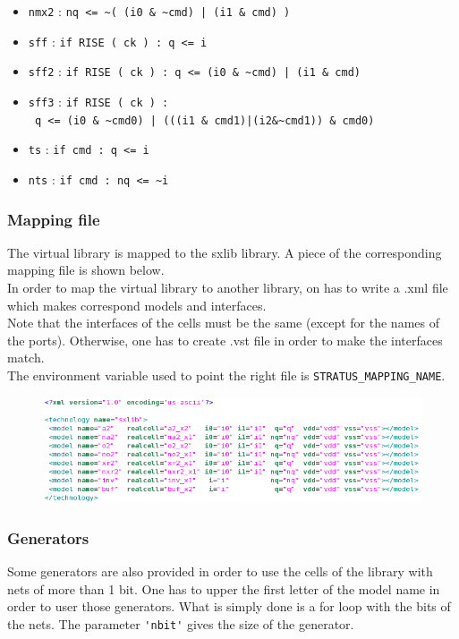 \begin{itemize}
    \item \verb-nmx2- : \verb-nq <= ~( (i0 & ~cmd) | (i1 & cmd) )-
    \item \verb-sff- : \verb-if RISE ( ck ) : q <= i-
    \item \verb-sff2- : \verb-if RISE ( ck ) : q <= (i0 & ~cmd) | (i1 & cmd)-
    \item \verb-sff3- : \verb-if RISE ( ck ) :-\\\verb- q <= (i0 & ~cmd0) | (((i1 & cmd1)|(i2&~cmd1)) & cmd0)-
    \item \verb-ts- : \verb-if cmd : q <= i-
    \item \verb-nts- : \verb-if cmd : nq <= ~i-
\end{itemize}

\subsubsection{Mapping file}

The virtual library is mapped to the sxlib library. A piece of the corresponding mapping file is shown below.\\
\indent In order to map the virtual library to another library, on has to write a .xml file which makes correspond models and interfaces.\\
\indent Note that the interfaces of the cells must be the same (except for the names of the ports). Otherwise, one has to create .vst file in order to make the interfaces match.\\

\indent The environment variable used to point the right file is \verb-STRATUS_MAPPING_NAME-.

\begin{figure}[hbtp]
\centering
\includegraphics[width=\textwidth]{images/xml}
\end{figure}

\subsubsection{Generators}

Some generators are also provided in order to use the cells of the library with nets of more than 1 bit. One has to upper the first letter of the model name in order to user those generators. What is simply done is a for loop with the bits of the nets. The parameter \verb-'nbit'- gives the size of the generator.

